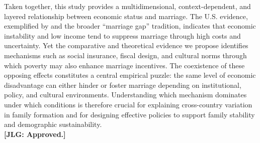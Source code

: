 Taken together, this study provides a multidimensional, context-dependent, and layered relationship between economic status and marriage. The U.S. evidence, exemplified by \citet{GarciaHeckman2023} and the broader ``marriage gap'' tradition, indicates that economic instability and low income tend to suppress marriage through high costs and uncertainty. Yet the comparative and theoretical evidence we propose identifies mechanisms such as social insurance, fiscal design, and cultural norms through which poverty may also enhance marriage incentives. The coexistence of these opposing effects constitutes a central empirical puzzle: the same level of economic disadvantage can either hinder or foster marriage depending on institutional, policy, and cultural environments. Understanding which mechanism dominates under which conditions is therefore crucial for explaining cross-country variation in family formation and for designing effective policies to support family stability and demographic sustainability. \\ 

\noindent \textbf{[JLG: Approved.]}

\newpage






